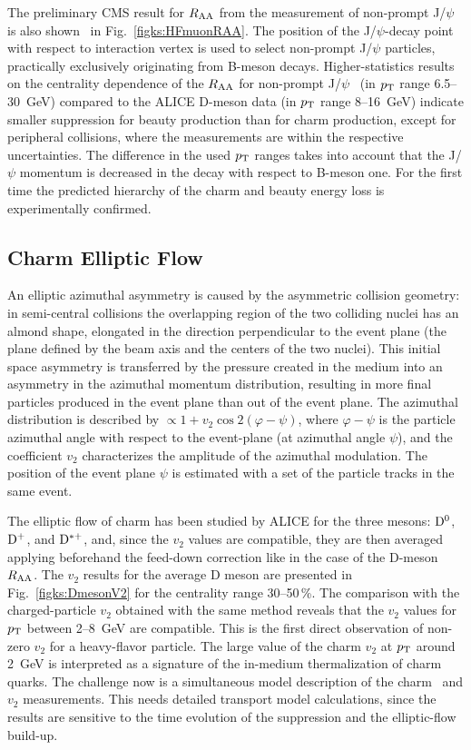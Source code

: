 The preliminary CMS result for $R_{\rm AA}$ from the measurement of non-prompt J/$\psi$ is also shown~\cite{Chatrchyan:2012np} in Fig.~\ref{figks:HFmuonRAA}. The position of the J/$\psi$-decay point with respect to interaction vertex is used to select non-prompt J/$\psi$ particles, practically exclusively originating from B-meson decays. Higher-statistics results on the centrality dependence of the $R_{\rm AA}$ for non-prompt J/$\psi$~\cite{CMS:2012wba} (in $p_{\rm T}$ range 6.5--30~GeV) compared to the ALICE D-meson data (in $p_{\rm T}$ range 8--16~GeV) indicate smaller suppression for beauty production than for charm production, except for peripheral collisions, where the measurements are within the respective uncertainties. The difference in the used $p_{\rm T}$ ranges takes into account that the J/$\psi$ momentum is decreased in the decay with respect to B-meson one. For the first time the predicted hierarchy of the charm and beauty energy loss is experimentally confirmed.

\subsection{Charm Elliptic Flow}
\label{subsecks:heavyflow}
 An elliptic azimuthal asymmetry is caused by the asymmetric collision geometry: in semi-central collisions the overlapping region of the two colliding nuclei has an almond shape, elongated in the direction perpendicular to the event plane (the plane defined by the beam axis and the centers of the two nuclei). This initial space asymmetry is transferred by the pressure created in the medium into an asymmetry in the azimuthal momentum distribution, resulting in more final particles produced in the event plane than out of the event plane. The azimuthal distribution is described by $\propto 1 + v_2 \cos{2(\varphi - \psi)}$, where $\varphi - \psi$ is the particle azimuthal angle with respect to the event-plane (at azimuthal angle $\psi$), and the coefficient $v_2$ characterizes the amplitude of the azimuthal modulation. The position of the event plane $\psi$ is estimated with a set of the particle tracks in the same event.

The elliptic flow of charm has been studied by ALICE for the three mesons: ${\rm D}^0$, ${\rm D}^+$, and ${\rm D}^{*+}$, and, since the $v_2$ values are compatible, they are then averaged applying beforehand the feed-down correction like in the case of the D-meson $R_{\rm AA}$. The $v_2$ results for the average D meson are presented in Fig.~\ref{figks:DmesonV2} for the centrality range 30--50\,\%. The comparison with the charged-particle $v_2$ obtained with the same method reveals that the $v_2$ values for $p_{\rm T}$ between 2--8~GeV are compatible. This is the first direct observation of non-zero $v_2$ for a heavy-flavor particle. The large value of the charm $v_2$ at $p_{\rm T}$ around 2~GeV is interpreted as a signature of the in-medium thermalization of charm quarks. The challenge now is a simultaneous model description of the charm \Raa\ and $v_2$ measurements. This needs detailed transport model calculations, since the results are sensitive to the time evolution of the suppression and the elliptic-flow build-up.

